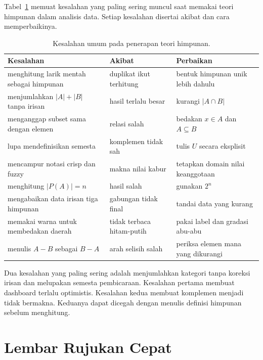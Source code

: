 \documentclass[11pt,a4paper]{article}
\begin{document}
Tabel~\ref{tab:kesalahan} memuat kesalahan yang paling sering muncul saat memakai teori himpunan dalam analisis data. Setiap kesalahan disertai akibat dan cara memperbaikinya.

\begin{table}[H]
	\centering
	\caption{Kesalahan umum pada penerapan teori himpunan.}
	\label{tab:kesalahan}
	\footnotesize
	\begin{tabularx}{\textwidth}{l X X}
		\toprule
		Kesalahan                                & Akibat                    & Perbaikan                             \\
		\midrule
		menghitung larik mentah sebagai himpunan & duplikat ikut terhitung   & bentuk himpunan unik lebih dahulu     \\
		menjumlahkan $|A|+|B|$ tanpa irisan      & hasil terlalu besar       & kurangi $|A \cap B|$                  \\
		menganggap subset sama dengan elemen     & relasi salah              & bedakan $x \in A$ dan $A \subseteq B$ \\
		lupa mendefinisikan semesta              & komplemen tidak sah       & tulis $U$ secara eksplisit            \\
		mencampur notasi crisp dan fuzzy         & makna nilai kabur         & tetapkan domain nilai keanggotaan     \\
		menghitung $|P(A)|=n$                    & hasil salah               & gunakan $2^n$                         \\
		mengabaikan data irisan tiga himpunan    & gabungan tidak final      & tandai data yang kurang               \\
		memakai warna untuk membedakan daerah    & tidak terbaca hitam-putih & pakai label dan gradasi abu-abu       \\
		menulis $A-B$ sebagai $B-A$              & arah selisih salah        & periksa elemen mana yang dikurangi    \\
		\bottomrule
	\end{tabularx}
\end{table}

Dua kesalahan yang paling sering adalah menjumlahkan kategori tanpa koreksi irisan dan melupakan semesta pembicaraan. Kesalahan pertama membuat dashboard terlalu optimistis. Kesalahan kedua membuat komplemen menjadi tidak bermakna. Keduanya dapat dicegah dengan menulis definisi himpunan sebelum menghitung.

\section{Lembar Rujukan Cepat}
\end{document}
